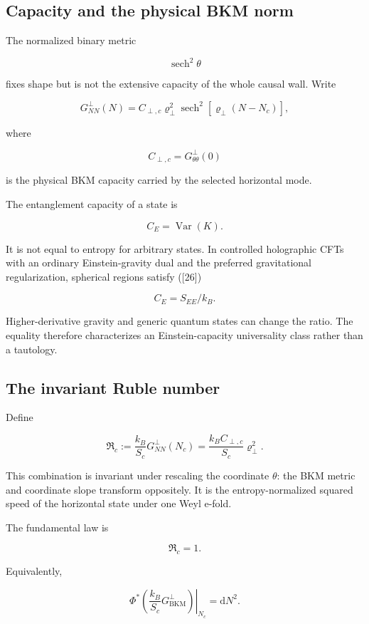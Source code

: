\documentclass[
  11pt,
  letterpaper,
]{article}
\begin{document}
\subsection{Capacity and the physical BKM
norm}\label{capacity-and-the-physical-bkm-norm}

The normalized binary metric

\[
\operatorname{sech}^2\theta
\]

fixes shape but is not the extensive capacity of the whole causal wall.
Write

\[
G^{\perp}_{NN}(N)
=C_{\perp,c}\varrho_\perp^2\operatorname{sech}^2[\varrho_\perp(N-N_c)],
\]

where

\[
C_{\perp,c}=G^{\perp}_{\theta\theta}(0)
\]

is the physical BKM capacity carried by the selected horizontal mode.

The entanglement capacity of a state is

\[
C_E=\operatorname{Var}(K).
\]

It is not equal to entropy for arbitrary states. In controlled
holographic CFTs with an ordinary Einstein-gravity dual and the
preferred gravitational regularization, spherical regions satisfy
({[}26{]})

\[
C_E=S_{EE}/k_B.
\]

Higher-derivative gravity and generic quantum states can change the
ratio. The equality therefore characterizes an Einstein-capacity
universality class rather than a tautology.

\subsection{The invariant Ruble
number}\label{the-invariant-ruble-number}

Define

\[
\boxed{
\mathfrak R_c
:=\frac{k_B}{S_c}G^{\perp}_{NN}(N_c)
=\frac{k_BC_{\perp,c}}{S_c}\varrho_\perp^2.
}
\]

This combination is invariant under rescaling the coordinate \(\theta\):
the BKM metric and coordinate slope transform oppositely. It is the
entropy-normalized squared speed of the horizontal state under one Weyl
e-fold.

The fundamental law is

\[
\boxed{\mathfrak R_c=1.}
\]

Equivalently,

\[
\boxed{
\left.
\Phi^*\left(\frac{k_B}{S_c}G^{\perp}_{\mathrm{BKM}}\right)
\right|_{N_c}
=\mathrm dN^2.
}
\]
\end{document}
